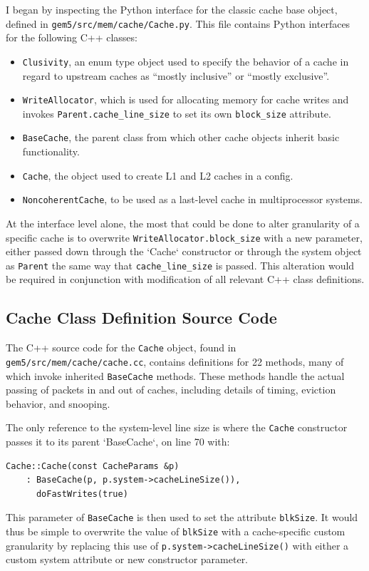 \documentclass[12pt,twoside]{reedthesis}
\begin{document}
	I began by inspecting the Python interface for the classic cache base object, defined in \verb`gem5/src/mem/cache/Cache.py`. This file contains Python interfaces for the following C++ classes:
	\begin{itemize}
		\item \verb`Clusivity`, an enum type object used to specify the behavior of a cache in regard to upstream caches as ``mostly inclusive'' or ``mostly exclusive''.
		\item \verb`WriteAllocator`, which is used for allocating memory for cache writes and invokes \verb`Parent.cache_line_size` to set its own \verb`block_size` attribute.
		\item \verb`BaseCache`, the parent class from which other cache objects inherit basic functionality.
		\item \verb`Cache`, the object used to create L1 and L2 caches in a config.
		\item \verb`NoncoherentCache`, to be used as a last-level cache in multiprocessor systems.
	\end{itemize}

	At the interface level alone, the most that could be done to alter granularity of a specific cache is to overwrite \verb`WriteAllocator.block_size` with a new parameter, either passed down through the `Cache` constructor or through the system object as \verb`Parent` the same way that \verb`cache_line_size` is passed. This alteration would be required in conjunction with modification of all relevant C++ class definitions.

	\subsection*{Cache Class Definition Source Code}

	The C++ source code for the \verb`Cache` object, found in \verb`gem5/src/mem/cache/cache.cc`, contains definitions for 22 methods, many of which invoke inherited \verb`BaseCache` methods. These methods handle the actual passing of packets in and out of caches, including details of timing, eviction behavior, and snooping.

	The only reference to the system-level line size is where the \verb`Cache` constructor passes it to its parent `BaseCache`, on line 70 with:
	\begin{verbatim}
Cache::Cache(const CacheParams &p)
    : BaseCache(p, p.system->cacheLineSize()),
      doFastWrites(true)
	\end{verbatim}
	This parameter of \verb`BaseCache` is then used to set the attribute \verb`blkSize`. It would thus be simple to overwrite the value of \verb`blkSize` with a cache-specific custom granularity by replacing this use of \verb`p.system->cacheLineSize()` with either a custom system attribute or new constructor parameter.
\end{document}
